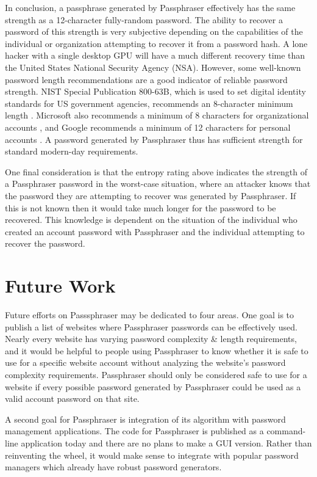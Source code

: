 \documentclass[
	a4paper, %
	10pt, %
	unnumberedsections, %
	twoside, %
]{LTJournalArticle}
\begin{document}
In conclusion, a passphrase generated by Passphraser effectively has the same strength as a 12-character fully-random password. The ability to recover a password of this strength is very subjective depending on the capabilities of the individual or organization attempting to recover it from a password hash. A lone hacker with a single desktop GPU will have a much different recovery time than the United States National Security Agency (NSA). However, some well-known password length recommendations are a good indicator of reliable password strength. NIST Special Publication 800-63B, which is used to set digital identity standards for US government agencies, recommends an 8-character minimum length \autocite{nistpassword}. Microsoft also recommends a minimum of 8 characters for organizational accounts \autocite{microsoftpassword}, and Google recommends a minimum of 12 characters for personal accounts \autocite{googlepassword}. A password generated by Passphraser thus has sufficient strength for standard modern-day requirements.

One final consideration is that the entropy rating above indicates the strength of a Passphraser password in the worst-case situation, where an attacker knows that the password they are attempting to recover was generated by Passphraser. If this is not known then it would take much longer for the password to be recovered. This knowledge is dependent on the situation of the individual who created an account password with Passphraser and the individual attempting to recover the password.

\section{Future Work}

Future efforts on Passsphraser may be dedicated to four areas. One goal is to publish a list of websites where Passphraser passwords can be effectively used. Nearly every website has varying password complexity \& length requirements, and it would be helpful to people using Passphraser to know whether it is safe to use for a specific website account without analyzing the website's password complexity requirements. Passphraser should only be considered safe to use for a website if every possible password generated by Passphraser could be used as a valid account password on that site.

A second goal for Passphraser is integration of its algorithm with password management applications. The code for Passphraser is published as a command-line application today and there are no plans to make a GUI version. Rather than reinventing the wheel, it would make sense to integrate with popular password managers which already have robust password generators.
\end{document}
